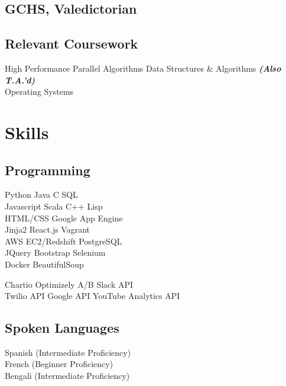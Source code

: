 \documentclass[]{deedy-resume-openfont}
\begin{document}
\begin{minipage}[t]{0.31\textwidth}
\subsection{GCHS, Valedictorian}
\sectionsep

\subsection{Relevant Coursework}
High Performance Parallel Algorithms
Data Structures \& Algorithms
{\footnotesize \textit{\textbf{(Also T.A.'d) }}} \\
Operating Systems
\\[1\baselineskip]


\section{Skills}
\subsection{Programming}

Python \textbullet{}  Java   \textbullet{} C \textbullet{} SQL
\\[1\baselineskip]

Javascript \textbullet{} Scala \textbullet{}  C++  \textbullet{} Lisp
\\[1\baselineskip]

HTML/CSS \textbullet{} Google App Engine \\
\textbullet{}  Jinja2 \textbullet{} React.js \textbullet{}  Vagrant \\
\textbullet{} AWS EC2/Redshift \textbullet{} PostgreSQL 
\\[1\baselineskip]

JQuery \textbullet{} Bootstrap \textbullet{}  Selenium \\
\textbullet{} Docker \textbullet{} BeautifulSoup
\sectionsep

Chartio \textbullet{}  Optimizely A/B \textbullet{}  Slack API \\
\textbullet{}  Twilio API \textbullet{}  Google API \textbullet{} YouTube Analytics API
\sectionsep

\subsection{Spoken Languages}
Spanish (Intermediate Proficiency) \\
French (Beginner Proficiency)\\
Bengali (Intermediate Proficiency)
\\[1\baselineskip]


\end{minipage}
\end{document}
